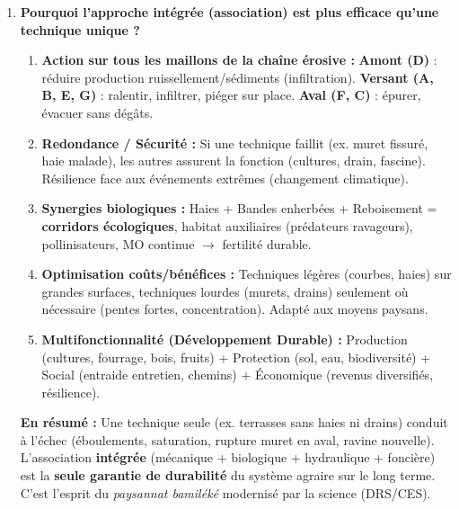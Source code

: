 \documentclass[11pt]{article}
\begin{document}
\begin{corrige}
\begin{enumerate}
    \item \textbf{Pourquoi l'approche intégrée (association) est plus efficace qu'une technique unique ?}
    \begin{aretenir}
    \begin{enumerate}
        \item \textbf{Action sur tous les maillons de la chaîne érosive :} \textbf{Amont (D)} : réduire production ruissellement/sédiments (infiltration). \textbf{Versant (A, B, E, G)} : ralentir, infiltrer, piéger sur place. \textbf{Aval (F, C)} : épurer, évacuer sans dégâts.
        \item \textbf{Redondance / Sécurité :} Si une technique faillit (ex. muret fissuré, haie malade), les autres assurent la fonction (cultures, drain, fascine). Résilience face aux événements extrêmes (changement climatique).
        \item \textbf{Synergies biologiques :} Haies + Bandes enherbées + Reboisement = \textbf{corridors écologiques}, habitat auxiliaires (prédateurs ravageurs), pollinisateurs, MO continue $\rightarrow$ fertilité durable.
        \item \textbf{Optimisation coûts/bénéfices :} Techniques légères (courbes, haies) sur grandes surfaces, techniques lourdes (murets, drains) seulement où nécessaire (pentes fortes, concentration). Adapté aux moyens paysans.
        \item \textbf{Multifonctionnalité (Développement Durable) :} Production (cultures, fourrage, bois, fruits) + Protection (sol, eau, biodiversité) + Social (entraide entretien, chemins) + Économique (revenus diversifiés, résilience).
    \end{enumerate}
    \end{aretenir}
    \textbf{En résumé :} Une technique seule (ex. terrasses sans haies ni drains) conduit à l'échec (éboulements, saturation, rupture muret en aval, ravine nouvelle). L'association \textbf{intégrée} (mécanique + biologique + hydraulique + foncière) est la \textbf{seule garantie de durabilité} du système agraire sur le long terme. C'est l'esprit du \emph{paysannat bamiléké} modernisé par la science (DRS/CES).
\end{enumerate}
\end{corrige}
\end{document}
